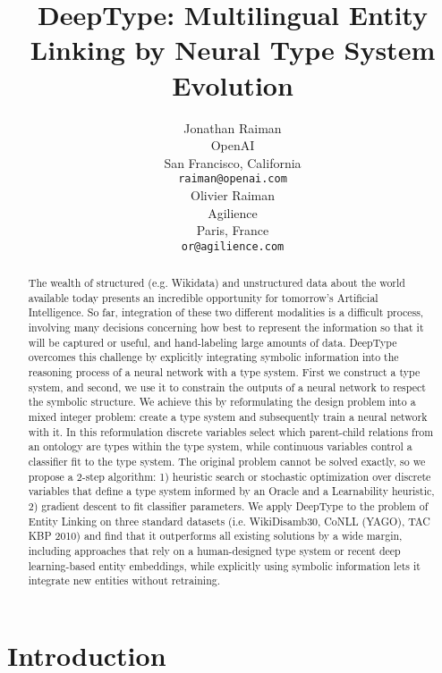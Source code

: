 \documentclass[letterpaper]{article}
\title{DeepType: Multilingual Entity Linking by Neural Type System Evolution}
\begin{document}
\author{Jonathan Raiman\\
OpenAI\\
San Francisco, California\\
\texttt{raiman@openai.com} \\
\And
Olivier Raiman\\
Agilience\\
Paris, France\\
\texttt{or@agilience.com}
}


\maketitle
\begin{abstract}
The wealth of structured (e.g. Wikidata) and unstructured data about the world available today presents an incredible opportunity for tomorrow's Artificial Intelligence. So far, integration of these two different modalities is a difficult process, involving many decisions concerning how best to represent the information so that it will be captured or useful, and hand-labeling large amounts of data.
DeepType overcomes this challenge by explicitly integrating symbolic information into the reasoning process of a neural network with a type system.
First we construct a type system, and second, we use it to constrain the outputs of a neural network to respect the symbolic structure. We achieve this by reformulating the design problem into a mixed integer problem: create a type system and subsequently train a neural network with it. In this reformulation discrete variables select which parent-child relations from an ontology are types within the type system, while continuous variables control a classifier fit to the type system. The original problem cannot be solved exactly, so we propose a 2-step algorithm: 1) heuristic search or stochastic optimization over discrete variables that define a type system informed by an Oracle and a Learnability heuristic, 2) gradient descent to fit classifier parameters.
We apply DeepType to the problem of Entity Linking on three standard datasets (i.e. WikiDisamb30, CoNLL (YAGO), TAC KBP 2010) and find that it outperforms all existing solutions by a wide margin, including approaches that rely on a human-designed type system or recent deep learning-based entity embeddings, while explicitly using symbolic information lets it integrate new entities without retraining.
\end{abstract}

\section{Introduction}
\end{document}
